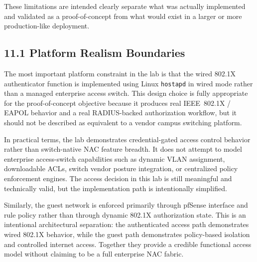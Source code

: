 \documentclass[11pt]{article}
\begin{document}
These limitations are intended clearly separate what was actually implemented and validated as a proof-of-concept from what would exist in a larger or more production-like deployment.


\subsection{11.1 Platform Realism Boundaries}
\label{sec:platform-realism-boundaries}

The most important platform constraint in the lab is that the wired 802.1X authenticator function is implemented using Linux \texttt{hostapd} in wired mode rather than a managed enterprise access switch. This design choice is fully appropriate for the proof-of-concept objective because it produces real IEEE~802.1X / EAPOL behavior and a real RADIUS-backed authorization workflow, but it should not be described as equivalent to a vendor campus switching platform.

In practical terms, the lab demonstrates credential-gated access control behavior rather than switch-native NAC feature breadth. It does not attempt to model enterprise access-switch capabilities such as dynamic VLAN assignment, downloadable ACLs, switch vendor posture integration, or centralized policy enforcement engines. The access decision in this lab is still meaningful and technically valid, but the implementation path is intentionally simplified.

Similarly, the guest network is enforced primarily through pfSense interface and rule policy rather than through dynamic 802.1X authorization state. This is an intentional architectural separation: the authenticated access path demonstrates wired 802.1X behavior, while the guest path demonstrates policy-based isolation and controlled internet access. Together they provide a credible functional access model without claiming to be a full enterprise NAC fabric.
\end{document}
